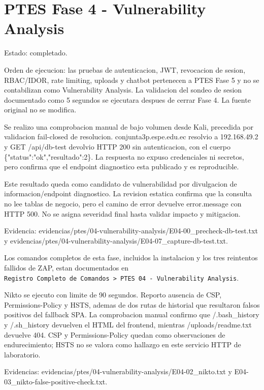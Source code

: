 \section{PTES Fase 4 - Vulnerability Analysis}\label{ptes-fase-4---vulnerability-analysis}

Estado: completado.

Orden de ejecucion: las pruebas de autenticacion, JWT, revocacion de sesion, RBAC/IDOR, rate limiting, uploads y chatbot pertenecen a PTES Fase 5 y no se contabilizan como Vulnerability Analysis. La validacion del sondeo de sesion documentado como 5 segundos se ejecutara despues de cerrar Fase 4. La fuente original no se modifica.

Se realizo una comprobacion manual de bajo volumen desde Kali, precedida por validacion fail-closed de resolucion. conjunta3p.espe.edu.ec resolvio a 192.168.49.2 y GET /api/db-test devolvio HTTP 200 sin autenticacion, con el cuerpo \{"status":"ok","resultado":2\}. La respuesta no expuso credenciales ni secretos, pero confirma que el endpoint diagnostico esta publicado y es reproducible.

Este resultado queda como candidato de vulnerabilidad por divulgacion de informacion/endpoint diagnostico. La revision estatica confirma que la consulta no lee tablas de negocio, pero el camino de error devuelve error.message con HTTP 500. No se asigna severidad final hasta validar impacto y mitigacion.

Evidencia: evidencias/ptes/04-vulnerability-analysis/E04-00\_precheck-db-test.txt y evidencias/ptes/04-vulnerability-analysis/E04-07\_capture-db-test.txt.

Los comandos completos de esta fase, incluidos la instalacion y los tres reintentos fallidos de ZAP, estan documentados en \texttt{Registro\ Completo\ de\ Comandos\ \textgreater{}\ PTES\ 04\ -\ Vulnerability\ Analysis}.

Nikto se ejecuto con limite de 90 segundos. Reporto ausencia de CSP, Permissions-Policy y HSTS, ademas de dos rutas de historial que resultaron falsos positivos del fallback SPA. La comprobacion manual confirmo que /.bash\_history y /.sh\_history devuelven el HTML del frontend, mientras /uploads/readme.txt devuelve 404. CSP y Permissions-Policy quedan como observaciones de endurecimiento; HSTS no se valora como hallazgo en este servicio HTTP de laboratorio.

Evidencias: evidencias/ptes/04-vulnerability-analysis/E04-02\_nikto.txt y E04-03\_nikto-false-positive-check.txt.


